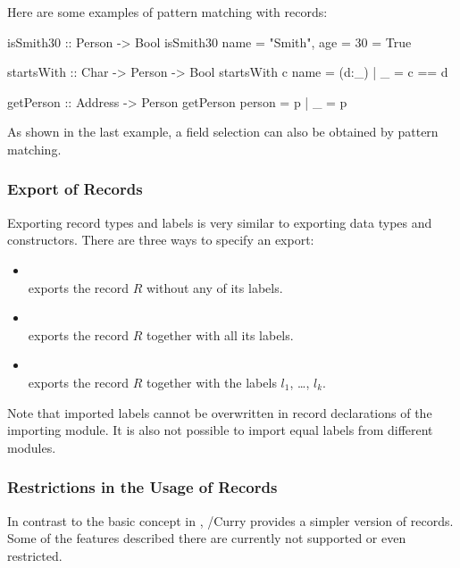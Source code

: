 Here are some examples of pattern matching with records:
\begin{curry}
isSmith30 :: Person -> Bool
isSmith30 {name = "Smith", age = 30} = True
\end{curry}
\begin{curry}
startsWith :: Char -> Person -> Bool
startsWith c {name = (d:_) | _} = c == d
\end{curry}
\begin{curry}
getPerson :: Address -> Person
getPerson {person = p | _} = p
\end{curry}
As shown in the last example, a field selection can also be obtained
by pattern matching.


\subsubsection{Export of Records}
\label{sec-exprecs}

Exporting record types and labels is very similar to exporting
data types and constructors. There are three ways
to specify an export:
\begin{itemize}
\item {} \\
  exports the record $R$ without any of its labels.
\item {} \\
  exports the record $R$ together with all its labels.
\item {} \\
  exports the record $R$ together with the labels $l_1$, \ldots, $l_k$.
\end{itemize}
%
Note that imported labels cannot be overwritten in record declarations
of the importing module. It is also not possible to import equal labels
from different modules.


\subsubsection{Restrictions in the Usage of Records}
\label{sec-restrinrecs}

In contrast to the basic concept in \cite{Leijen05}, \CYS/Curry provides a
simpler version of records. Some of the features described there are
currently not supported or even restricted.

